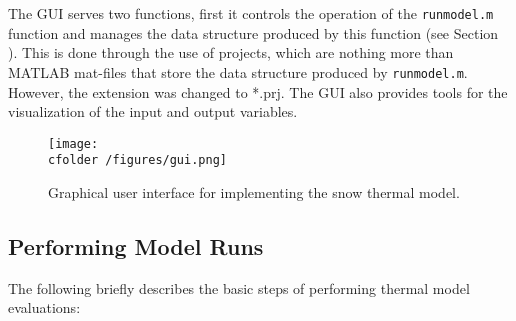 The GUI serves two functions, first it controls the operation of the \texttt{runmodel.m} function and manages the data structure produced by this function (see Section ).  This is done through the use of projects, which are nothing more than MATLAB mat-files that store the data structure produced by \texttt{runmodel.m}. However, the extension was changed to *.prj.  The GUI also provides tools for the visualization of the input and output variables.

\begin{figure}[ht!]\centering
\texttt{[image: \\cfolder /figures/gui.png]}
\caption{Graphical user interface for implementing the snow thermal model.}
\label{TM:fig:gui}
\end{figure}

\subsection{Performing Model Runs}
The following briefly describes the basic steps of performing thermal model evaluations:
